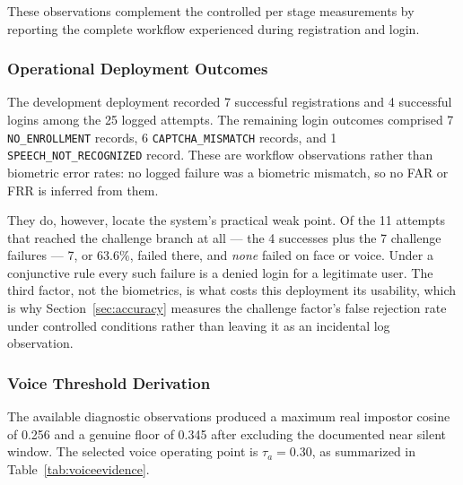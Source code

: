 \documentclass[runningheads]{llncs}
\begin{document}
{These observations complement the controlled per stage measurements by reporting the complete workflow experienced during registration and login.

\subsubsection{Operational Deployment Outcomes}\label{sec:outcomes}
The development deployment recorded 7 successful registrations and 4 successful logins among the 25 logged attempts. The remaining login outcomes comprised 7 \texttt{NO\_ENROLLMENT} records, 6 \texttt{CAPTCHA\_MISMATCH} records, and 1 \texttt{SPEECH\_NOT\_RECOGNIZED} record. These are workflow observations rather than biometric error rates: no logged failure was a biometric mismatch, so no FAR or FRR is inferred from them.

They do, however, locate the system's practical weak point. Of the 11 attempts that reached the challenge branch at all --- the 4 successes plus the 7 challenge failures --- 7, or $63.6\%$, failed there, and \emph{none} failed on face or voice. Under a conjunctive rule every such failure is a denied login for a legitimate user. The third factor, not the biometrics, is what costs this deployment its usability, which is why Section~\ref{sec:accuracy} measures the challenge factor's false rejection rate under controlled conditions rather than leaving it as an incidental log observation.

\subsubsection{Voice Threshold Derivation}
The available diagnostic observations produced a maximum real impostor cosine of 0.256 and a genuine floor of 0.345 after excluding the documented near silent window. The selected voice operating point is $\tau_a=0.30$, as summarized in Table~\ref{tab:voiceevidence}.

}
\end{document}
